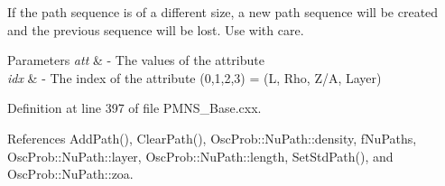 If the path sequence is of a different size, a new path sequence will be created and the previous sequence will be lost. Use with care.


\begin{DoxyParams}{Parameters}
{\em att} & -\/ The values of the attribute \\
\hline
{\em idx} & -\/ The index of the attribute (0,1,2,3) = (L, Rho, Z/A, Layer) \\
\hline
\end{DoxyParams}


Definition at line 397 of file P\+M\+N\+S\+\_\+\+Base.\+cxx.



References Add\+Path(), Clear\+Path(), Osc\+Prob\+::\+Nu\+Path\+::density, f\+Nu\+Paths, Osc\+Prob\+::\+Nu\+Path\+::layer, Osc\+Prob\+::\+Nu\+Path\+::length, Set\+Std\+Path(), and Osc\+Prob\+::\+Nu\+Path\+::zoa.


